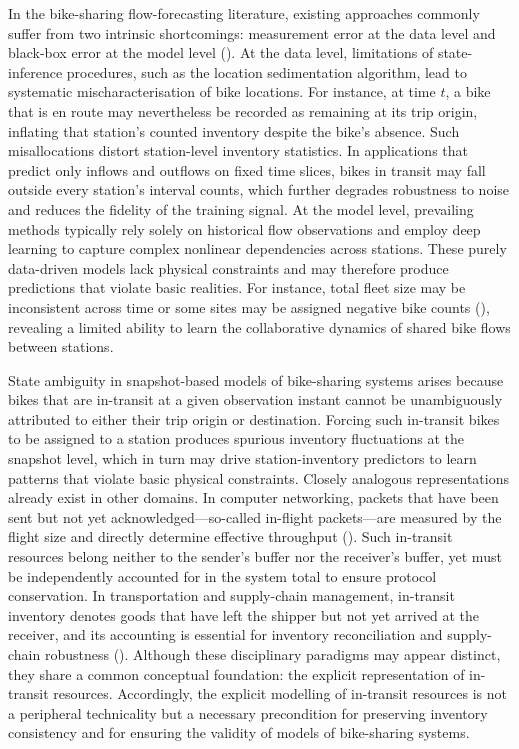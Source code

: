 \documentclass[preprint,12pt,authoryear]{elsarticle}
\begin{document}
In the bike-sharing flow-forecasting literature, existing approaches commonly suffer from two intrinsic shortcomings: measurement error at the data level and black-box error at the model level (\cite{li2023improving}).  At the data level, limitations of state-inference procedures, such as the location sedimentation algorithm, lead to systematic mischaracterisation of bike locations. For instance, at time $t$, a bike that is en route may nevertheless be recorded as remaining at its trip origin, inflating that station's counted inventory despite the bike's absence. Such misallocations distort station-level inventory statistics. In applications that predict only inflows and outflows on fixed time slices, bikes in transit may fall outside every station's interval counts, which further degrades robustness to noise and reduces the fidelity of the training signal. At the model level, prevailing methods typically rely solely on historical flow observations and employ deep learning to capture complex nonlinear dependencies across stations. These purely data-driven models lack physical constraints and may therefore produce predictions that violate basic realities. For instance, total fleet size may be inconsistent across time or some sites may be assigned negative bike counts (\cite{MOHSENI2026104701}), revealing a limited ability to learn the collaborative dynamics of shared bike flows between stations.

State ambiguity in snapshot-based models of bike-sharing systems arises because bikes that are in-transit at a given observation instant cannot be unambiguously attributed to either their trip origin or destination. Forcing such in-transit bikes to be assigned to a station produces spurious inventory fluctuations at the snapshot level, which in turn may drive station-inventory predictors to learn patterns that violate basic physical constraints. Closely analogous representations already exist in other domains. In computer networking, packets that have been sent but not yet acknowledged—so-called in-flight packets—are measured by the flight size and directly determine effective throughput (\cite{biaz2003round}). Such in-transit resources belong neither to the sender's buffer nor the receiver's buffer, yet must be independently accounted for in the system total to ensure protocol conservation. In transportation and supply-chain management, in-transit inventory denotes goods that have left the shipper but not yet arrived at the receiver, and its accounting is essential for inventory reconciliation and supply-chain robustness (\cite{zhi2022effects}). Although these disciplinary paradigms may appear distinct, they share a common conceptual foundation: the explicit representation of in-transit resources. Accordingly, the explicit modelling of in-transit resources is not a peripheral technicality but a necessary precondition for preserving inventory consistency and for ensuring the validity of models of bike-sharing systems.
\end{document}
